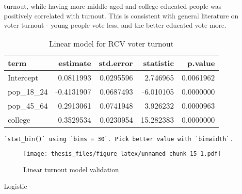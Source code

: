 \documentclass[12pt,twoside]{reedthesis}
\theoremstyle{definition}
\theoremstyle{definition}
\theoremstyle{definition}
\theoremstyle{remark}
\begin{document}
turnout, while having more middle-aged and college-educated people was
positively correlated with turnout. This is consistent with general
literature on voter turnout - young people vote less, and the better
educated vote more.
\begin{longtable}[t]{lrrrr}
\caption[Linear turnout model]{\label{tab:unnamed-chunk-15}Linear model for RCV voter turnout}\\
\toprule
term & estimate & std.error & statistic & p.value\\
\midrule
Intercept & 0.0811993 & 0.0295596 & 2.746965 & 0.0061962\\
pop\_18\_24 & -0.4131907 & 0.0687493 & -6.010105 & 0.0000000\\
pop\_45\_64 & 0.2913061 & 0.0741948 & 3.926232 & 0.0000963\\
college & 0.3529534 & 0.0230954 & 15.282383 & 0.0000000\\
\bottomrule
\end{longtable}
\begin{verbatim}
`stat_bin()` using `bins = 30`. Pick better value with `binwidth`.
\end{verbatim}
\begin{figure}
\centering
\texttt{[image: thesis\_files/figure-latex/unnamed-chunk-15-1.pdf]}
\caption{\label{fig:unnamed-chunk-15}Linear turnout model validation}
\end{figure}
Logistic -
\end{document}
